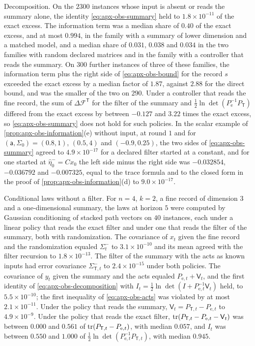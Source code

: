 \begin{numcheck}
Decomposition. On the $2300$ instances whose input is absent or reads the summary alone, the identity \eqref{eq:apx-obs-summary} held to $1.8\times10^{-11}$ of the exact excess. The information term was a median share of $0.40$ of the exact excess, and at most $0.994$, in the family with a summary of lower dimension and a matched model, and a median share of $0.031$, $0.038$ and $0.034$ in the two families with random declared matrices and in the family with a controller that reads the summary. On $300$ further instances of three of these families, the information term plus the right side of \eqref{eq:apx-obs-bound} for the record $s$ exceeded the exact excess by a median factor of $1.87$, against $2.88$ for the direct bound, and was the smaller of the two on $290$. Under a controller that reads the fine record, the sum of $\Delta\mathcal F^{\mathsf T}$ for the filter of the summary and $\frac12\ln\det(P_{\mathrm e}^{-1}P_{\mathsf T})$ differed from the exact excess by between $-0.127$ and $3.22$ times the exact excess, so \eqref{eq:apx-obs-summary} does not hold for such policies. In the scalar example of \cref{prop:apx-obs-information}(e) without input, at round $1$ and for $(\mathsf a,\Sigma_0)=(0.8,1)$, $(0.5,4)$ and $(-0.9,0.25)$, the two sides of \eqref{eq:apx-obs-summary} agreed to $4.9\times10^{-17}$ for a declared filter started at a constant, and for one started at $\hat\eta^-_0=Cx_0$ the left side minus the right side was $-0.032854$, $-0.036792$ and $-0.007325$, equal to the trace formula and to the closed form in the proof of \cref{prop:apx-obs-information}(d) to $9.0\times10^{-17}$.

Conditional laws without a filter. For $n=4$, $k=2$, a fine record of dimension $3$ and a one-dimensional summary, the laws at horizon $5$ were computed by Gaussian conditioning of stacked path vectors on $40$ instances, each under a linear policy that reads the exact filter and under one that reads the filter of the summary, both with randomization. The covariance of $x_t$ given the fine record and the randomization equaled $\Sigma^-_t$ to $3.1\times10^{-10}$ and its mean agreed with the filter recursion to $1.8\times10^{-13}$. The filter of the summary with the acts as known inputs had error covariance $\Sigma^-_{\mathsf T,t}$ to $2.4\times10^{-15}$ under both policies. The covariance of $y_t$ given the summary and the acts equaled $P_{\mathrm e,t}+\mathsf V_t$, and the first identity of \eqref{eq:apx-obs-decomposition} with $I_t=\frac12\ln\det(I+P_{\mathrm e,t}^{-1}\mathsf V_t)$ held, to $5.5\times10^{-10}$; the first inequality of \eqref{eq:apx-obs-acts} was violated by at most $2.1\times10^{-11}$. Under the policy that reads the summary, $\mathsf V_t=P_{\mathsf T,t}-P_{\mathrm e,t}$ to $4.9\times10^{-9}$. Under the policy that reads the exact filter, $\operatorname{tr}(P_{\mathsf T,t}-P_{\mathrm e,t}-\mathsf V_t)$ was between $0.000$ and $0.561$ of $\operatorname{tr}(P_{\mathsf T,t}-P_{\mathrm e,t})$, with median $0.057$, and $I_t$ was between $0.550$ and $1.000$ of $\frac12\ln\det(P_{\mathrm e,t}^{-1}P_{\mathsf T,t})$, with median $0.945$.


\end{numcheck}
